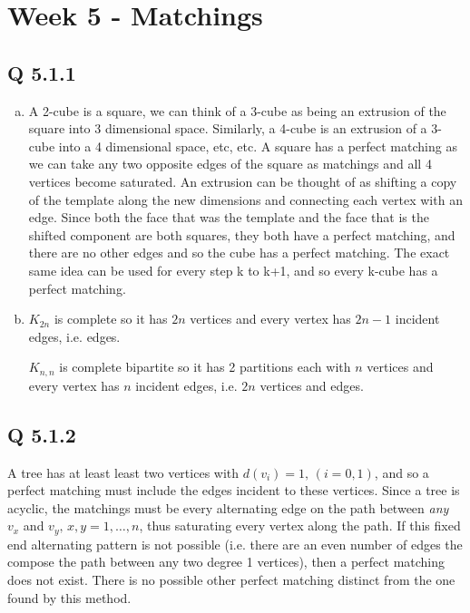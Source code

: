 

\chapter[Week 5 - Matchings]{Week 5 - Matchings}


\section{Q 5.1.1}
\begin{enumerate}[(a)]

\item A 2-cube is a square, we can think of a 3-cube as being an extrusion of the square into 3 dimensional space. Similarly, a 4-cube is an extrusion of a 3-cube into a 4 dimensional space, etc, etc. A square has a perfect matching as we can take any two opposite edges of the square as matchings and all 4 vertices become saturated. An extrusion can be thought of as shifting a copy of the template along the new dimensions and connecting each vertex with an edge. Since both the face that was the template and the face that is the shifted component are both squares, they both have a perfect matching, and there are no other edges and so the cube has a perfect matching. The exact same idea can be used for every step k to k+1, and so every k-cube has a perfect matching.
\item $K_{2n}$ is complete so it has $2n$ vertices and every vertex has $2n-1$ incident edges, i.e.  edges.

$K_{n,n}$ is complete bipartite so it has 2 partitions each with $n$ vertices and every vertex has $n$ incident edges, i.e. $2n$ vertices and  edges.

\end{enumerate}

\section{Q 5.1.2}

A tree has at least least two vertices with $d(v_i) = 1, \, (i = 0,1) $, and so a perfect matching must include the edges incident to these vertices. Since a tree is acyclic, the matchings must be every alternating edge on the path between \emph{any} $v_x $ and $ v_y,\, x,y = 1,\ldots,n$, thus saturating every vertex along the path. If this fixed end alternating pattern is not possible (i.e. there are an even number of edges the compose the path between any two degree 1 vertices), then a perfect matching does not exist. There is no possible other perfect matching distinct from the one found by this method.


